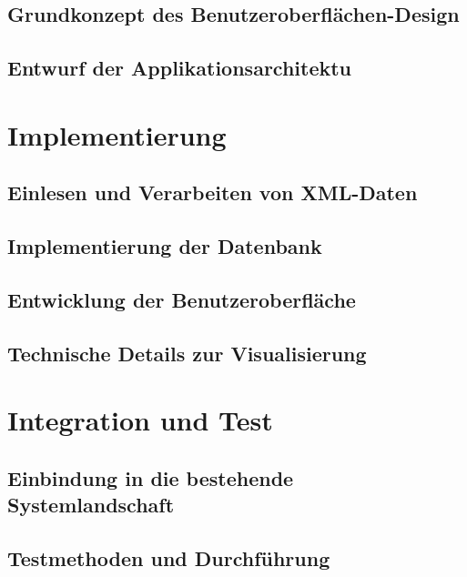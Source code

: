 \documentclass[
pagesize,				%
a4paper,				%
oneside,				%
headsepline,		    %
11pt,					%
halfparskip,		    %
final,					%
listof=totoc,		    %
]{scrartcl}			    %
\begin{document}
\subsection{Grundkonzept des Benutzeroberflächen-Design}

\subsection{Entwurf der Applikationsarchitektu}


\newpage
\section{Implementierung}
\label{Implementierung}

\subsection{Einlesen und Verarbeiten von XML-Daten}

\subsection{Implementierung der Datenbank}

\subsection{Entwicklung der Benutzeroberfläche}

\subsection{Technische Details zur Visualisierung}


\newpage
\section{Integration und Test}
\label{Integration und Test}

\subsection{Einbindung in die bestehende Systemlandschaft}

\subsection{Testmethoden und Durchführung}
\end{document}
